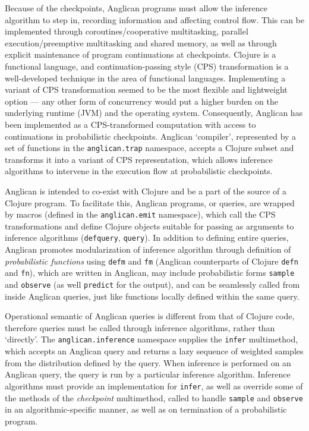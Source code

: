 \documentclass[a4paper]{article}
\begin{document}
Because of the checkpoints, Anglican programs must allow the
inference algorithm to step in, recording information and
affecting control flow. This can be implemented through
coroutines/cooperative multitasking, parallel execution/preemptive
multitasking and shared memory, as well as through explicit
maintenance of program continuations at checkpoints. Clojure is
a functional language, and continuation-passing style (CPS)
transformation is a well-developed technique in the area of
functional languages. Implementing a variant of CPS
transformation seemed to be the most flexible and lightweight
option --- any other form of concurrency would put a higher burden
on the underlying runtime (JVM) and the operating system.
Consequently, Anglican has been implemented as a CPS-transformed
computation with access to continuations in probabilistic
checkpoints. Anglican `compiler', represented by a set of
functions in the \texttt{anglican.trap} namespace, accepts a
Clojure subset and transforms it into a variant of CPS
representation, which allows inference algorithms to intervene
in the execution flow at probabilistic checkpoints.

Anglican is intended to co-exist with Clojure and be a part of
the source of a Clojure program. To facilitate this, Anglican
programs, or queries, are wrapped by macros (defined in the
\texttt{anglican.emit} namespace), which call the CPS
transformations and define Clojure objects suitable for passing
as arguments to inference algorithms (\texttt{defquery},
\texttt{query}). In addition to defining entire queries,
Anglican promotes modularization of inference algorithm through
definition of \textit{probabilistic functions} using
\texttt{defm} and \texttt{fm} (Anglican counterparts of Clojure
\texttt{defn} and \texttt{fn}), which are written in Anglican,
may include probabilistic forms \texttt{sample} and
\texttt{observe} (as well \texttt{predict} for the output), and
can be seamlessly called from inside Anglican queries, just like
functions locally defined within the same query.

Operational semantic of Anglican queries is different from that
of Clojure code, therefore queries must be called through
inference algorithms, rather than `directly'.  The
\texttt{anglican.inference} namespace supplies the
\texttt{infer} multimethod, which accepts an Anglican query and
returns a lazy sequence of weighted samples from the
distribution defined by the query.  When inference
is performed on an Anglican query, the query is run by a
particular inference algorithm. Inference algorithms must
provide an implementation for \texttt{infer}, as well as
override some of the methods of the \textit{checkpoint}
multimethod, called to handle \texttt{sample} and
\texttt{observe} in an algorithmic-specific manner, as well
as on termination of a probabilistic program.
\end{document}
